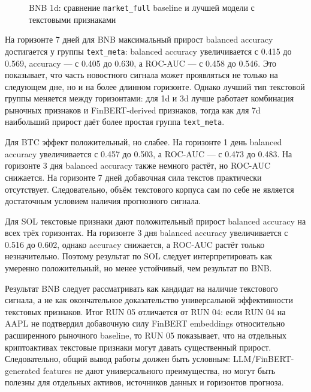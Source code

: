 \begin{figure}[htbp]
\centering
{}
\caption{BNB 1d: сравнение \texttt{market\_full} baseline и лучшей модели с текстовыми признаками}
\label{fig:run05_bnb_1d_market_vs_text}
\end{figure}

На горизонте 7 дней для BNB максимальный прирост balanced accuracy достигается у группы \texttt{text\_meta}: balanced accuracy увеличивается с 0.415 до 0.569, accuracy --- с 0.405 до 0.630, а ROC-AUC --- с 0.458 до 0.546. Это показывает, что часть новостного сигнала может проявляться не только на следующем дне, но и на более длинном горизонте. Однако лучший тип текстовой группы меняется между горизонтами: для 1d и 3d лучше работает комбинация рыночных признаков и FinBERT-derived признаков, тогда как для 7d наибольший прирост даёт более простая группа \texttt{text\_meta}.

Для BTC эффект положительный, но слабее. На горизонте 1 день balanced accuracy увеличивается с 0.457 до 0.503, а ROC-AUC --- с 0.473 до 0.483. На горизонте 3 дня balanced accuracy также немного растёт, но ROC-AUC снижается. На горизонте 7 дней добавочная сила текстов практически отсутствует. Следовательно, объём текстового корпуса сам по себе не является достаточным условием наличия прогнозного сигнала.

Для SOL текстовые признаки дают положительный прирост balanced accuracy на всех трёх горизонтах. На горизонте 3 дня balanced accuracy увеличивается с 0.516 до 0.602, однако accuracy снижается, а ROC-AUC растёт только незначительно. Поэтому результат по SOL следует интерпретировать как умеренно положительный, но менее устойчивый, чем результат по BNB.

Результат BNB следует рассматривать как кандидат на наличие текстового сигнала, а не как окончательное доказательство универсальной эффективности текстовых признаков. Итог RUN 05 отличается от RUN 04: если RUN 04 на AAPL не подтвердил добавочную силу FinBERT embeddings относительно расширенного рыночного baseline, то RUN 05 показывает, что на отдельных криптоактивах текстовые признаки могут давать существенный прирост. Следовательно, общий вывод работы должен быть условным: LLM/FinBERT-generated features не дают универсального преимущества, но могут быть полезны для отдельных активов, источников данных и горизонтов прогноза.
